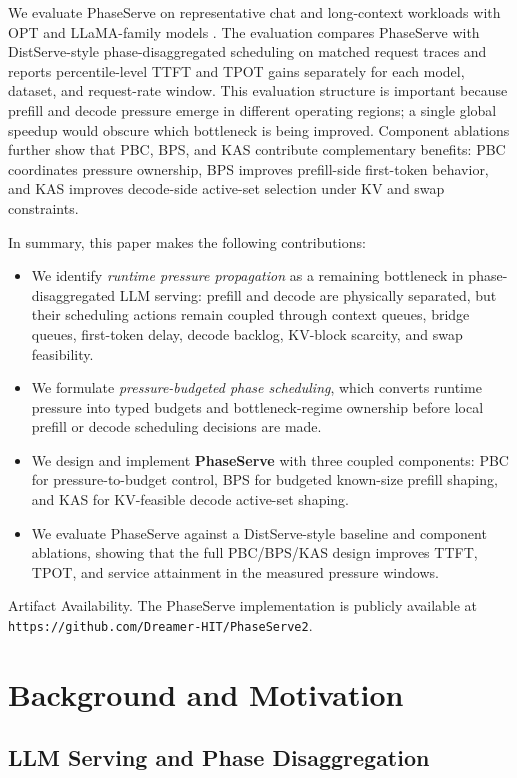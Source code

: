 \documentclass[lettersize,journal]{IEEEtran}
\begin{document}
We evaluate PhaseServe on representative chat and long-context workloads with OPT and LLaMA-family models \cite{b1,b3,sharegpt,longbench}. The evaluation compares PhaseServe with DistServe-style phase-disaggregated scheduling on matched request traces and reports percentile-level TTFT and TPOT gains separately for each model, dataset, and request-rate window. This evaluation structure is important because prefill and decode pressure emerge in different operating regions; a single global speedup would obscure which bottleneck is being improved. Component ablations further show that PBC, BPS, and KAS contribute complementary benefits: PBC coordinates pressure ownership, BPS improves prefill-side first-token behavior, and KAS improves decode-side active-set selection under KV and swap constraints.

In summary, this paper makes the following contributions:
\begin{itemize}
\item We identify \emph{runtime pressure propagation} as a remaining bottleneck in phase-disaggregated LLM serving: prefill and decode are physically separated, but their scheduling actions remain coupled through context queues, bridge queues, first-token delay, decode backlog, KV-block scarcity, and swap feasibility.
\item We formulate \emph{pressure-budgeted phase scheduling}, which converts runtime pressure into typed budgets and bottleneck-regime ownership before local prefill or decode scheduling decisions are made.
\item We design and implement \textbf{PhaseServe} with three coupled components: PBC for pressure-to-budget control, BPS for budgeted known-size prefill shaping, and KAS for KV-feasible decode active-set shaping.
\item We evaluate PhaseServe against a DistServe-style baseline and component ablations, showing that the full PBC/BPS/KAS design improves TTFT, TPOT, and service attainment in the measured pressure windows.
\end{itemize}

Artifact Availability. The PhaseServe implementation is publicly available at \texttt{https://github.com/Dreamer-HIT/PhaseServe2}.

\section{Background and Motivation}\label{background}

\subsection{LLM Serving and Phase Disaggregation}
\end{document}
